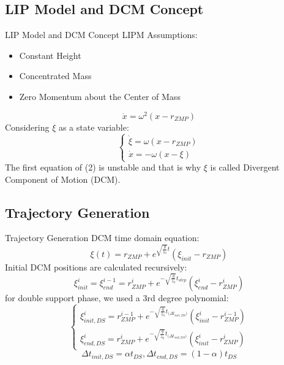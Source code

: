 \documentclass[aspectratio=169,t,xcolor=table]{beamer}
\begin{document}
\subsection{LIP Model and DCM Concept}
\begin{frame}{LIP Model and DCM Concept}
    LIPM Assumptions:
    \begin{itemize}
        \item Constant Height
        \item Concentrated Mass
        \item Zero Momentum about the Center of Mass
    \end{itemize}
    \begin{equation}
        \ddot{x} = \omega^{2}(x-r_{ZMP})
    \end{equation}
    Considering $\xi$ as a state variable:
    \begin{equation}
        \left\{
            \begin{matrix}
                \dot{\xi} = \omega(x-r_{ZMP})\\ 
                \dot{x} = -\omega(x-\xi)
            \end{matrix}
        \right.
    \end{equation}
    The first equation of (2) is unstable and that is why $\xi$ is called Divergent
    Component of Motion (DCM).
\end{frame}

\subsection{Trajectory Generation}
\begin{frame}{Trajectory Generation}
    DCM time domain equation:
    \begin{equation}
        \xi(t) = r_{ZMP} + e^{\sqrt{\frac{g}{z_0}}t}(\xi_{init} - r_{ZMP})
    \end{equation}
    Initial DCM positions are calculated recursively:
    \begin{equation}
        \xi_{init}^{i} = \xi_{end}^{i-1} = r_{ZMP}^i + e^{-\sqrt{\frac{g}{z_0}}t_{step}}(\xi_{end}^{i} - r_{ZMP}^i)
    \end{equation}
    for double support phase, we used a 3rd degree polynomial:
    \begin{equation}
        \left\{
            \begin{matrix}
                \xi_{init,DS}^{i} = r_{ZMP}^{i-1} + e^{-\sqrt{\frac{g}{z_0}}t_{(\Delta{t_{init,DS})}}}(\xi_{init}^{i} - r_{ZMP}^{i-1})\\ 
                \xi_{end,DS}^{i} = r_{ZMP}^{i} + e^{-\sqrt{\frac{g}{z_0}}t_{(\Delta{t_{end,DS})}}}(\xi_{init}^{i} - r_{ZMP}^{i})
            \end{matrix}
        \right.
    \end{equation}
    \begin{equation*}
        \Delta{t_{init,DS}}=\alpha t_{DS}, \Delta{t_{end,DS}}=(1-\alpha) t_{DS}
    \end{equation*}
\end{frame}
\end{document}
